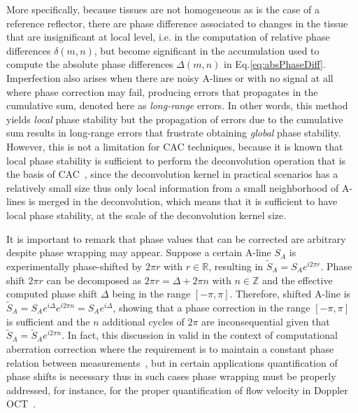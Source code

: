 More specifically, because tissues are not homogeneous as is the case of a reference reflector, there are phase difference associated to changes in the tissue that are insignificant at local level, i.e. in the computation of relative phase differences $\delta(m,n)$, but become significant in the accumulation used to compute the absolute phase differences $\Delta(m,n)$ in Eq.\eqref{eq:absPhaseDiff}. Imperfection also arises when there are noisy A-lines or with no signal at all where phase correction may fail, producing errors that propagates in the cumulative sum, denoted here as \textit{long-range} errors. In other words, this method yields \textit{local} phase stability but the propagation of errors due to the cumulative sum results in long-range errors that frustrate obtaining \textit{global} phase stability. However, this is not a limitation for CAC techniques, because it is known that local phase stability is sufficient to perform the deconvolution operation that is the basis of CAC~\cite{Shemonski2014_Stability}, since the deconvolution kernel in practical scenarios has a relatively small size thus only local information from a small neighborhood of A-lines is merged in the deconvolution, which means that it is sufficient to have local phase stability, at the scale of the deconvolution kernel size.

It is important to remark that phase values that can be corrected are arbitrary despite phase wrapping may appear. Suppose a certain A-line $S_A$ is experimentally phase-shifted by $2\pi r$ with $r\in\mathbb{R}$, resulting in $\tilde{S}_A=S_Ae^{i2\pi r}$. Phase shift $2\pi r$ can be decomposed as $2\pi r = \Delta + 2\pi n$ with $n\in \mathbb{Z}$ and the effective computed phase shift $\Delta$ being in the range $[-\pi, \pi]$. Therefore, shifted A-line is $\tilde{S}_A=S_Ae^{i\Delta} e^{i2\pi n}=S_A e^{i\Delta}$, showing that a phase correction in the range $[-\pi, \pi]$ is sufficient and the $n$ additional cycles of $2\pi$ are inconsequential given that $\tilde{S}_A = \tilde{S}_Ae^{i2\pi n}$. In fact, this discussion in valid in the context of computational aberration correction where the requirement is to maintain a constant phase relation between measurements~\cite{Shemonski2014_Stability}, but in certain applications quantification of phase shifts is necessary thus in such cases phase wrapping must be properly addressed, for instance, for the proper quantification of flow velocity in Doppler OCT~\cite{Hong2012_Highpenetration}.

